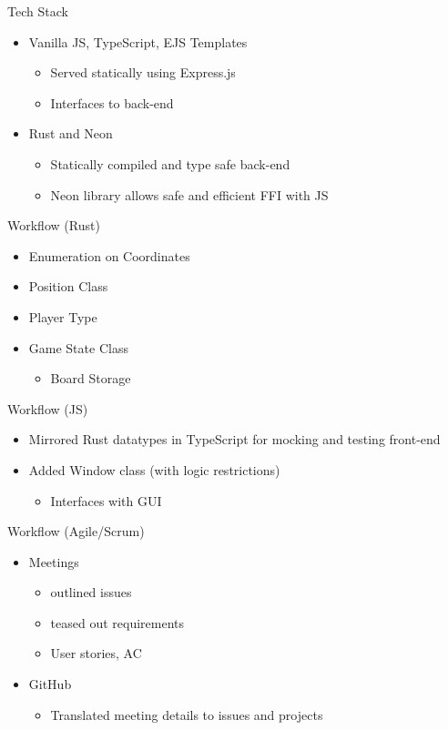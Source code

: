 \documentclass[presentation]{beamer}
\begin{document}
\begin{frame}[label={sec:org5642c99}]{Tech Stack}
\begin{itemize}
\item Vanilla JS, TypeScript, EJS Templates
\begin{itemize}
\item Served statically using Express.js
\item Interfaces to back-end
\end{itemize}
\item Rust and Neon
\begin{itemize}
\item Statically compiled and type safe back-end
\item Neon library allows safe and efficient FFI with JS
\end{itemize}
\end{itemize}
\end{frame}
\begin{frame}[label={sec:org840f37f}]{Workflow (Rust)}
\begin{itemize}
\item Enumeration on Coordinates
\item Position Class
\item Player Type
\item Game State Class
\begin{itemize}
\item Board Storage
\end{itemize}
\end{itemize}
\end{frame}
\begin{frame}[label={sec:org76f8a32}]{Workflow (JS)}
\begin{itemize}
\item Mirrored Rust datatypes in TypeScript for mocking and testing front-end
\item Added Window class (with logic restrictions)
\begin{itemize}
\item Interfaces with GUI
\end{itemize}
\end{itemize}
\end{frame}
\begin{frame}[label={sec:orgd97e51b}]{Workflow (Agile/Scrum)}
\begin{itemize}
\item Meetings
\begin{itemize}
\item outlined issues
\item teased out requirements
\item User stories, AC
\end{itemize}
\item GitHub
\begin{itemize}
\item Translated meeting details to issues and projects
\end{itemize}
\end{itemize}
\end{frame}
\end{document}
